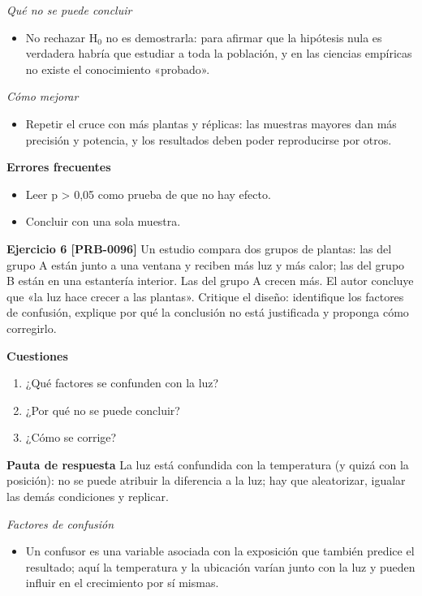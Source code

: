 \documentclass{book}
\begin{document}
\noindent\textit{Qué no se puede concluir}
\begin{itemize}
\item No rechazar H\({}_{0}\) no es demostrarla: para afirmar que la hipótesis nula es verdadera habría que estudiar a toda la población, y en las ciencias empíricas no existe el conocimiento «probado».
\end{itemize}

\noindent\textit{Cómo mejorar}
\begin{itemize}
\item Repetir el cruce con más plantas y réplicas: las muestras mayores dan más precisión y potencia, y los resultados deben poder reproducirse por otros.
\end{itemize}

\noindent\textbf{Errores frecuentes}
\begin{itemize}
\item Leer p > 0,05 como prueba de que no hay efecto.
\item Concluir con una sola muestra.
\end{itemize}

\noindent\textbf{Ejercicio 6 [PRB-0096]}
Un estudio compara dos grupos de plantas: las del grupo A están junto a una ventana y reciben más luz y más calor; las del grupo B están en una estantería interior. Las del grupo A crecen más. El autor concluye que «la luz hace crecer a las plantas». Critique el diseño: identifique los factores de confusión, explique por qué la conclusión no está justificada y proponga cómo corregirlo.


\noindent\textbf{Cuestiones}
\begin{enumerate}
\item ¿Qué factores se confunden con la luz?
\item ¿Por qué no se puede concluir?
\item ¿Cómo se corrige?
\end{enumerate}

\noindent\textbf{Pauta de respuesta}
La luz está confundida con la temperatura (y quizá con la posición): no se puede atribuir la diferencia a la luz; hay que aleatorizar, igualar las demás condiciones y replicar.


\noindent\textit{Factores de confusión}
\begin{itemize}
\item Un confusor es una variable asociada con la exposición que también predice el resultado; aquí la temperatura y la ubicación varían junto con la luz y pueden influir en el crecimiento por sí mismas.
\end{itemize}
\end{document}
